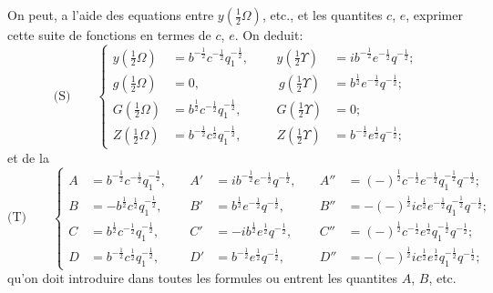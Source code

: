 \documentclass[11pt,a4paper]{book}
\begin{document}
On peut, a l'aide des equations entre $y\left(\frac{1}{2}\Omega\right)$, etc., et les quantites $c$, $e$, exprimer
cette suite de fonctions en termes de $c$, $e$. On deduit:
\begin{equation*}
\text{(S)}\qquad
\left\{
\begin{alignedat}{2}
y\left(\tfrac{1}{2}\Omega\right) &= b^{-\frac{1}{2}} c^{-\frac{1}{2}} q_1^{-\frac{1}{2}},\quad
&y\left(\tfrac{1}{2}\Upsilon\right) &= ib^{-\frac{1}{2}} e^{-\frac{1}{2}} q^{-\frac{1}{2}};\\
g\left(\tfrac{1}{2}\Omega\right) &= 0,\qquad\qquad\quad\,
&\, g\left(\tfrac{1}{2}\Upsilon\right) &= b^{\frac{1}{2}} e^{-\frac{1}{2}} q^{-\frac{1}{2}};\\
G\left(\tfrac{1}{2}\Omega\right) &= b^{\frac{1}{2}} c^{-\frac{1}{2}} q_1^{-\frac{1}{2}},\quad
&G\left(\tfrac{1}{2}\Upsilon\right) &= 0;\\
Z\left(\tfrac{1}{2}\Omega\right) &= b^{-\frac{1}{2}} c^{\frac{1}{2}} q_1^{-\frac{1}{2}},\quad
&Z\left(\tfrac{1}{2}\Upsilon\right) &= b^{-\frac{1}{2}} e^{\frac{1}{2}} q^{-\frac{1}{2}};
\end{alignedat}
\right.
\end{equation*}
et de la
\begin{equation*}
\text{(T)}\qquad
\left\{
\begin{alignedat}{3}
A &= b^{-\frac{1}{2}} c^{-\frac{1}{2}} q_1^{-\frac{1}{2}},\quad &A' &= ib^{-\frac{1}{2}} e^{-\frac{1}{2}} q^{-\frac{1}{2}},\quad &A'' &= (-)^{\frac{1}{2}} c^{-\frac{1}{2}} e^{-\frac{1}{2}} q_1^{-\frac{1}{2}} q^{-\frac{1}{2}};\\
B &= -b^{\frac{1}{2}} c^{\frac{1}{2}} q_1^{-\frac{1}{2}},\quad &B' &= b^{\frac{1}{2}} e^{-\frac{1}{2}} q^{-\frac{1}{2}},\quad &B'' &= -(-)^{\frac{1}{2}} ic^{\frac{1}{2}} e^{-\frac{1}{2}} q_1^{-\frac{1}{2}} q^{-\frac{1}{2}};\\
C &= b^{\frac{1}{2}} c^{-\frac{1}{2}} q_1^{-\frac{1}{2}},\quad &C' &= -ib^{\frac{1}{2}} e^{\frac{1}{2}} q^{-\frac{1}{2}},\quad &C'' &= (-)^{\frac{1}{2}} c^{-\frac{1}{2}} e^{\frac{1}{2}} q_1^{-\frac{1}{2}} q^{-\frac{1}{2}};\\
D &= b^{-\frac{1}{2}} c^{\frac{1}{2}} q_1^{-\frac{1}{2}},\quad &D' &= b^{-\frac{1}{2}} e^{\frac{1}{2}} q^{-\frac{1}{2}},\quad &D'' &= -(-)^{\frac{1}{2}} ic^{\frac{1}{2}} e^{\frac{1}{2}} q_1^{-\frac{1}{2}} q^{-\frac{1}{2}};
\end{alignedat}
\right.
\end{equation*}
qu'on doit introduire dans toutes les formules ou entrent les quantites $A$, $B$, etc.
\end{document}
